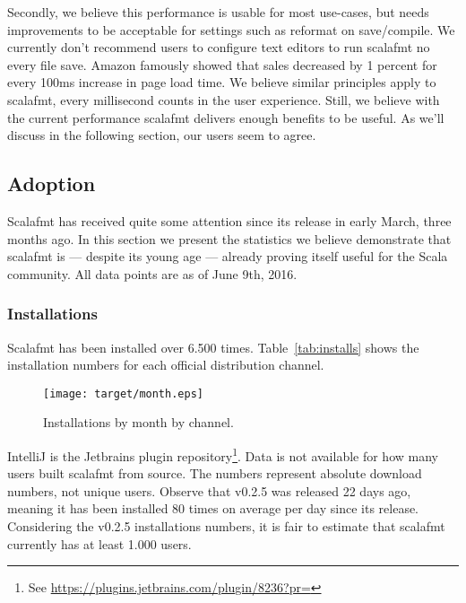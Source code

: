 Secondly, we believe this performance is usable for most use-cases, but needs improvements to be acceptable for settings such as reformat on save/compile.
We currently don't recommend users to configure text editors to run scalafmt no every file save.
Amazon famously showed that sales decreased by 1 percent for every 100ms increase in page load time\autocite{kohavi2007online}.
We believe similar principles apply to scalafmt, every millisecond counts in the user experience.
Still, we believe with the current performance scalafmt delivers enough benefits to be useful.
As we'll discuss in the following section, our users seem to agree.

\subsection{Adoption}\label{sec:adoption}
Scalafmt has received quite some attention since its release in early March, three months ago.
In this section we present the statistics we believe demonstrate that scalafmt is --- despite its young age --- already proving itself useful for the Scala community.
All data points are as of June 9th, 2016.

\subsubsection{Installations}
Scalafmt has been installed over 6.500 times.
  Table~\ref{tab:installs} shows the installation numbers for each official distribution channel.
  \begin{figure}
    \CenterFloatBoxes
    \begin{floatrow}
      \ffigbox
      {\texttt{[image: target/month.eps]}}
      {\caption{Installations by month by channel.}\label{fig:installs}}
      \killfloatstyle
    \end{floatrow}
  \end{figure}
IntelliJ is the Jetbrains plugin repository\footnote{
  See \url{https://plugins.jetbrains.com/plugin/8236?pr=}
}.
Data is not available for how many users built scalafmt from source.
The numbers represent absolute download numbers, not unique users.
Observe that v0.2.5 was released 22 days ago, meaning it has been installed 80 times on average per day since its release.
Considering the v0.2.5 installations numbers, it is fair to estimate that scalafmt currently has at least 1.000 users.

